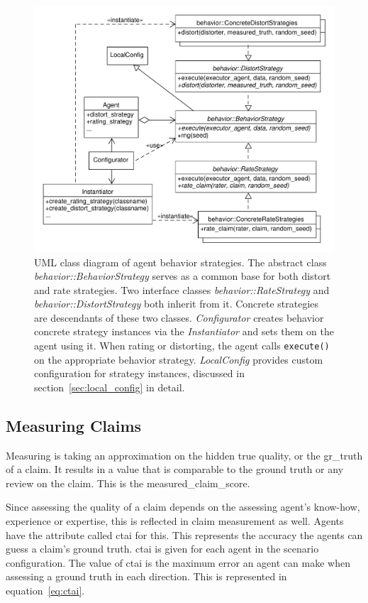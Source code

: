 \documentclass[%
    ]{\PathToTumTemplate/thesis/tum_thesis}
\begin{document}
\begin{figure}[tbp]
  \begin{center}
        \includegraphics[width=1\linewidth]	{../uml/behavior_strategies.pdf}
    \caption{
	UML class diagram of agent behavior strategies.
	The abstract class \emph{behavior::BehaviorStrategy} serves as a common base for both distort and rate strategies.
	Two interface classes \emph{behavior::RateStrategy} and \emph{behavior::DistortStrategy} both inherit from it.
	Concrete strategies are descendants of these two classes.
	\emph{Configurator} creates behavior concrete strategy instances via the \emph{Instantiator} and sets them on the agent using it.
	When rating or distorting, the agent calls \lstinline{execute()} on the appropriate behavior strategy.
	\emph{LocalConfig} provides custom configuration for strategy instances, discussed in section~\ref{sec:local_config} in detail.
    }
    \label{fig:behavior_strategies}
  \end{center}
\end{figure}


\subsection{Measuring Claims}
Measuring is taking an approximation on the hidden true quality, or the \gls{gr_truth} of a claim.
It results in a value that is comparable to the ground truth or any review on the claim.
This is the \gls{measured_claim_score}.

Since assessing the quality of a claim depends on the assessing agent's know-how, experience or expertise, this is reflected in claim measurement as well.
Agents have the attribute called \gls{ctai} for this.
This represents the accuracy the agents can guess a claim's ground truth.
\Gls{ctai} is given for each agent in the scenario configuration.
The value of \gls{ctai} is the maximum error an agent can make when assessing a ground truth in each direction.
This is represented in equation~\ref{eq:ctai}.
\end{document}
